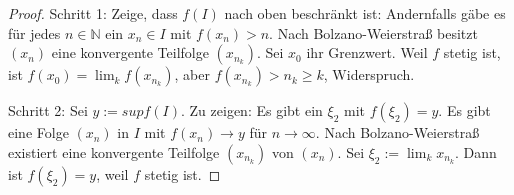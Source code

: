 \documentclass[a4paper,10pt]{article}
\begin{document}
\begin{proof}
 Schritt 1: Zeige, dass $f(I)$ nach oben beschränkt ist:
 Andernfalls gäbe es für jedes $n \in \mathbb{N}$ ein $x_n \in I$ mit $f(x_n) > n$.
 Nach Bolzano-Weierstraß besitzt $(x_n)$ eine konvergente Teilfolge $(x_{n_k})$.
 Sei $x_0$ ihr Grenzwert.
 Weil $f$ stetig ist, ist $f(x_0) = \lim_{k} f(x_{n_k})$, aber $f(x_{n_k}) > n_k \ge k$, Widerspruch.
 
 Schritt 2: Sei $y := sup f(I)$.
 Zu zeigen: Es gibt ein $\xi_2$ mit $f(\xi_2) = y$.
 Es gibt eine Folge $(x_n)$ in $I$ mit $f(x_n) \rightarrow y$ für $n \rightarrow \infty$.
 Nach Bolzano-Weierstraß existiert eine konvergente Teilfolge $(x_{n_k})$ von $(x_n)$.
 Sei $\xi_2 := \lim_k x_{n_k}$.
 Dann ist $f(\xi_2) = y$, weil $f$ stetig ist.
\end{proof}
\end{document}
